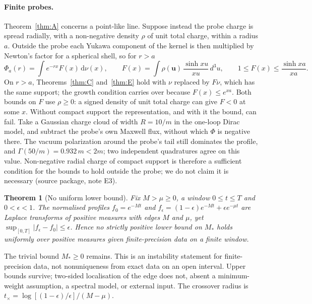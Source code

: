 \documentclass[11pt]{article}
\newtheorem{theorem}{Theorem}
\theoremstyle{definition}
\theoremstyle{remark}
\newcommand{\Mstar}{M_{*}}
\newcommand{\dnu}{\mathrm{d}\nu}
\begin{document}
\paragraph{Finite probes.}
Theorem~\ref{thm:A} concerns a point-like line. Suppose instead the probe
charge is spread radially, with a non-negative density $\rho$ of unit total
charge, within a radius $a$.
Outside the probe each Yukawa component of the kernel is then multiplied by
Newton's factor for a spherical shell, so for $r>a$
\begin{equation}
\Phi_{a}(r)=\int e^{-rx}F(x)\,\dnu(x),\qquad
F(x)=\int\rho(\mathbf u)\,\frac{\sinh xu}{xu}\,d^{3}u,\qquad
1\le F(x)\le\frac{\sinh xa}{xa}.
\end{equation}
On $r>a$, Theorems~\ref{thm:C} and~\ref{thm:E} hold with $\nu$ replaced by
$F\nu$, which has the same support; the growth condition carries over because
$F(x)\le e^{xa}$. Both bounds on $F$ use $\rho\ge0$: a signed density of unit
total charge can give $F<0$ at some $x$. Without compact support the
representation, and with it the bound, can fail. Take a Gaussian charge cloud
of width $R=10/m$ in the one-loop Dirac model, and subtract the probe's own
Maxwell flux, without which $\Phi$ is negative there. The vacuum polarization
around the probe's tail still dominates the profile, and
$\Gamma(50/m)=0.932\,m<2m$; two independent quadratures agree on this value.
Non-negative radial charge of compact support is therefore a sufficient
condition for the bounds to hold outside the probe; we do not claim it is
necessary (source package, note E3).

\begin{theorem}[No uniform lower bound]\label{thm:H}
Fix $M>\mu\ge0$, a window $0\le t\le T$ and $0<\epsilon<1$. The normalised
profiles $f_{0}=e^{-Mt}$ and
$f_{\epsilon}=(1-\epsilon)e^{-Mt}+\epsilon e^{-\mu t}$ are Laplace transforms of
positive measures with edges $M$ and $\mu$, yet
$\sup_{[0,T]}|f_{\epsilon}-f_{0}|\le\epsilon$. Hence no strictly positive lower bound on $\Mstar$
holds uniformly over positive measures given finite-precision data on a finite
window.
\end{theorem}

The trivial bound $\Mstar\ge0$ remains. This is an instability statement for
finite-precision data, not nonuniqueness from exact data on an open interval.
Upper bounds survive; two-sided localisation of the edge does not, absent a
minimum-weight assumption, a spectral model, or external input. The crossover
radius is $t_{\times}=\log[(1-\epsilon)/\epsilon]/(M-\mu)$.
\end{document}
